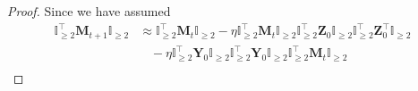 \documentclass{article}
\theoremstyle{plain}
\theoremstyle{remark}
\def\bY{\mathbf{Y}}
\def\bZ{\mathbf{Z}}
\newcommand{\cc}[1]{\text{\ding{\number\numexpr#1 + 171\relax}}}
\begin{document}
\begin{proof}
    Since we have assumed 
    \begin{align*}
        \mathbb{I}_{\ge2}^\top\mathbf{M}_{t+1} \mathbb{I}_{\ge2}
        &\approx
            \mathbb{I}_{\ge2}^\top\mathbf{M}_{t}\mathbb{I}_{\ge2} 
            - \eta\mathbb{I}_{\ge 2}^\top \mathbf{M}_{t}\mathbb{I}_{\ge 2}\mathbb{I}_{\ge 2}^\top\bZ_0\mathbb{I}_{\ge 2}\mathbb{I}_{\ge2}^\top \bZ_0^\top\mathbb{I}_{\ge2}
            \\
        &~~~~ 
            - \eta \mathbb{I}_{\ge2}^\top \bY_0 \mathbb{I}_{\ge2}\mathbb{I}_{\ge 2}^\top \bY_0\mathbb{I}_{\ge 2}\mathbb{I}_{\ge 2}^\top\mathbf{M}_{t} \mathbb{I}_{\ge 2}
        \\
        &~~~~ 

\end{align*}
\end{proof}
\end{document}
